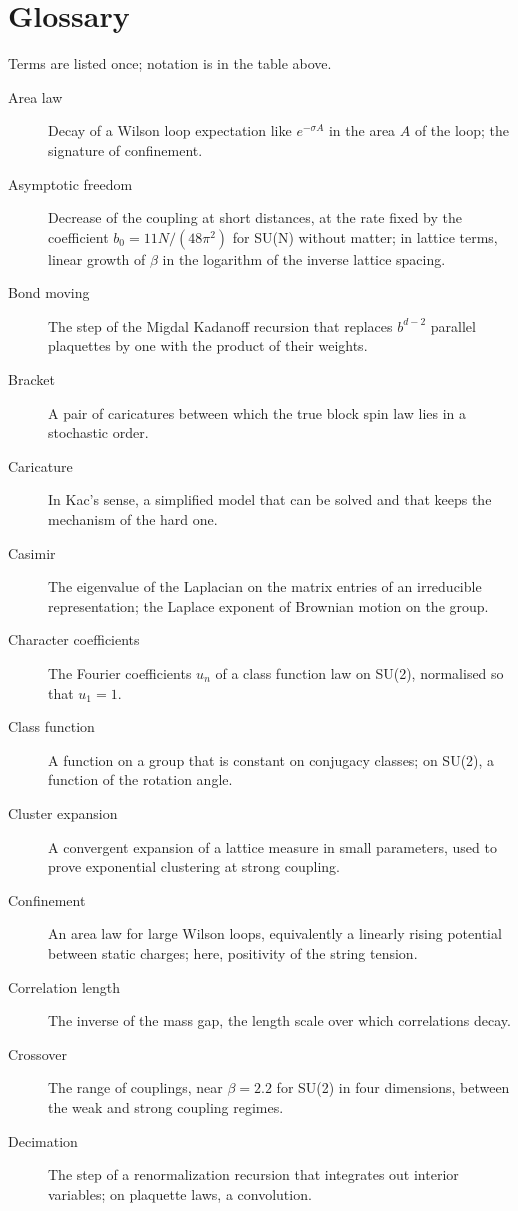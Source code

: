 \section{Glossary}\label{ch:glossary}

Terms are listed once; notation is in the table above.

\begin{description}
\item[Area law] Decay of a Wilson loop expectation like $e^{-\sigma A}$ in the area $A$ of the loop; the signature of confinement.
\item[Asymptotic freedom] Decrease of the coupling at short distances, at the rate fixed by the coefficient $b_0=11N/(48\pi^2)$ for SU(N) without matter; in lattice terms, linear growth of $\beta$ in the logarithm of the inverse lattice spacing.
\item[Bond moving] The step of the Migdal Kadanoff recursion that replaces $b^{d-2}$ parallel plaquettes by one with the product of their weights.
\item[Bracket] A pair of caricatures between which the true block spin law lies in a stochastic order.
\item[Caricature] In Kac's sense, a simplified model that can be solved and that keeps the mechanism of the hard one.
\item[Casimir] The eigenvalue of the Laplacian on the matrix entries of an irreducible representation; the Laplace exponent of Brownian motion on the group.
\item[Character coefficients] The Fourier coefficients $u_n$ of a class function law on SU(2), normalised so that $u_1=1$.
\item[Class function] A function on a group that is constant on conjugacy classes; on SU(2), a function of the rotation angle.
\item[Cluster expansion] A convergent expansion of a lattice measure in small parameters, used to prove exponential clustering at strong coupling.
\item[Confinement] An area law for large Wilson loops, equivalently a linearly rising potential between static charges; here, positivity of the string tension.
\item[Correlation length] The inverse of the mass gap, the length scale over which correlations decay.
\item[Crossover] The range of couplings, near $\beta=2.2$ for SU(2) in four dimensions, between the weak and strong coupling regimes.
\item[Decimation] The step of a renormalization recursion that integrates out interior variables; on plaquette laws, a convolution.

\end{description}
